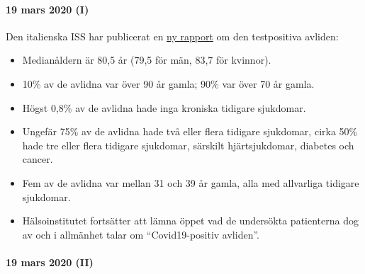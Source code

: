 \hypertarget{19-mars-2020-i}{%
\paragraph{19 mars 2020 (I)}\label{19-mars-2020-i}}

Den italienska ISS har publicerat en
\href{https://www.epicentro.iss.it/coronavirus/bollettino/Report-COVID-2019_17_marzo-v2.pdf}{ny
rapport} om den testpositiva avliden:

\begin{itemize}
\tightlist
\item
  Medianåldern är 80,5 år (79,5 för män, 83,7 för kvinnor).
\item
  10\% av de avlidna var över 90 år gamla; 90\% var över 70 år gamla.
\item
  Högst 0,8\% av de avlidna hade inga kroniska tidigare sjukdomar.
\item
  Ungefär 75\% av de avlidna hade två eller flera tidigare sjukdomar,
  cirka 50\% hade tre eller flera tidigare sjukdomar, särskilt
  hjärtsjukdomar, diabetes och cancer.
\item
  Fem av de avlidna var mellan 31 och 39 år gamla, alla med allvarliga
  tidigare sjukdomar.
\item
  Hälsoinstitutet fortsätter att lämna öppet vad de undersökta
  patienterna dog av och i allmänhet talar om ``Covid19-positiv
  avliden''.
\end{itemize}

\hypertarget{19-mars-2020-ii}{%
\paragraph{19 mars 2020 (II)}\label{19-mars-2020-ii}}

